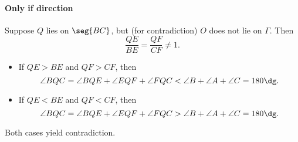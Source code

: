 \paragraph{Only if direction} Suppose $Q$ lies on $\seg{BC}$, but (for contradiction) $O$ does not lie on $\Gamma$. Then 
\[\frac{QE}{BE}=\frac{QF}{CF}\ne1.\]
\begin{itemize}
    \item If $QE>BE$ and $QF>CF$, then
        \[\angle BQC=\angle BQE+\angle EQF+\angle FQC<\angle B+\angle A+\angle C=180\dg.\]
    \item If $QE<BE$ and $QF<CF$, then
        \[\angle BQC=\angle BQE+\angle EQF+\angle FQC>\angle B+\angle A+\angle C=180\dg.\]
\end{itemize}
Both cases yield contradiction.
